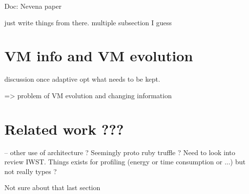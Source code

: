 \documentclass[a4paper,12pt,twoside]{../includes/ThesisStyle}
\begin{document}
Doc: Nevena paper

just write things from there. multiple subsection I guess

\section{VM info and VM evolution}

discussion once adaptive opt what needs to be kept.

=> problem of VM evolution and changing information

\section{Related work ???}
-- other use of architecture ? Seemingly proto ruby truffle ? Need to look into review IWST. Things exists for profiling (energy or time consumption or ...) but not really types ?

Not sure about that last section

\ifx\wholebook\relax\else
    
\end{document}
